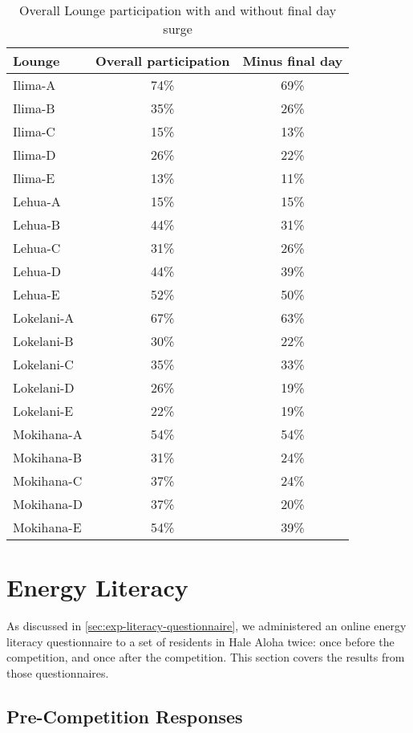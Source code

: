 \begin{table}[htbp]
	\centering
		\begin{tabular}{| l | c | c |}
			\hline
			Lounge & Overall participation & Minus final day \\ \hline
			Ilima-A & 74\% & 69\% \\ \hline
			Ilima-B & 35\% & 26\% \\ \hline
			Ilima-C & 15\% & 13\% \\ \hline
			Ilima-D & 26\% & 22\% \\ \hline
			Ilima-E & 13\% & 11\% \\ \hline
			Lehua-A & 15\% & 15\% \\ \hline
			Lehua-B & 44\% & 31\% \\ \hline
			Lehua-C & 31\% & 26\% \\ \hline
			Lehua-D & 44\% & 39\% \\ \hline
			Lehua-E & 52\% & 50\% \\ \hline
			Lokelani-A & 67\% & 63\% \\ \hline
			Lokelani-B & 30\% & 22\% \\ \hline
			Lokelani-C & 35\% & 33\% \\ \hline
			Lokelani-D & 26\% & 19\% \\ \hline
			Lokelani-E & 22\% & 19\% \\ \hline
			Mokihana-A & 54\% & 54\% \\ \hline
			Mokihana-B & 31\% & 24\% \\ \hline
			Mokihana-C & 37\% & 24\% \\ \hline
			Mokihana-D & 37\% & 20\% \\ \hline
			Mokihana-E & 54\% & 39\% \\ \hline
		\end{tabular}
	\caption{Overall Lounge participation with and without final day surge}
\label{tab:lounge-minus-endgame}
\end{table}


\section{Energy Literacy}

As discussed in \autoref{sec:exp-literacy-questionnaire}, we administered an online energy literacy questionnaire to a set of residents in Hale Aloha twice: once before the competition, and once after the competition. This section covers the results from those questionnaires.

\subsection{Pre-Competition Responses}

